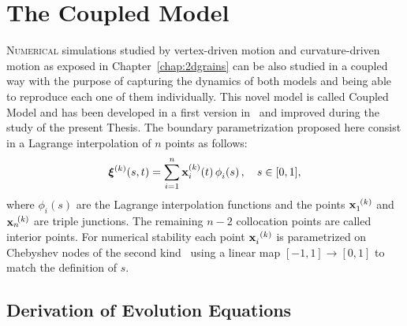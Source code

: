 \chapter{The Coupled Model}
\label{chap:coupledmodel}

\lettrine{N}{umerical} simulations studied by vertex-driven motion and curvature-driven motion as exposed in Chapter~\ref{chap:2dgrains} can be also studied in a coupled way with the purpose of capturing the dynamics of both models and being able to reproduce each one of them individually.
This novel model is called Coupled Model and has been developed in a first version in~\cite{bachelorthesisasazo} and improved during the study of the present Thesis. 
The boundary parametrization proposed here consist in a Lagrange interpolation of $n$ points as follows:
\begin{equation}
    \vxi^{(k)}(s,t) = \boundary,\quad s \in [0,1],
    \label{eq:boundarydiscret}
\end{equation}
where $\phi_i(s)$ are the Lagrange interpolation functions and the points $\x[1]^{(k)}$ and $\x[n]^{(k)}$ are triple junctions. The remaining $n-2$ collocation points are called interior points. For numerical stability each point $\x[i]^{(k)}$ is parametrized on Chebyshev nodes of the second kind~\cite{trefethen2000spectral} using a linear map $[-1,1] \to [0,1]$ to match the definition of $s$.

\section{Derivation of Evolution Equations}

